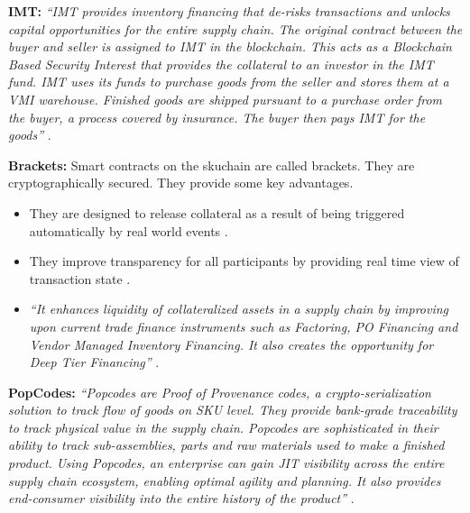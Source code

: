 \textbf{IMT:}
\textit{“IMT provides inventory financing that de-risks transactions and unlocks capital opportunities for the entire supply chain. The original contract between the buyer and seller is assigned to IMT in the blockchain. This acts as a Blockchain Based Security Interest that provides the collateral to an investor in the IMT fund. IMT uses its funds to purchase goods from the seller and stores them at a VMI warehouse. Finished goods are shipped pursuant to a purchase order from the buyer, a process covered by insurance. The buyer then pays IMT for the goods”} \cite{misc:015}.

\textbf{Brackets:}
Smart contracts on the skuchain are called brackets. They are cryptographically secured. They provide some key advantages. 

\begin{itemize}

\item They are designed to release collateral as a result of being triggered automatically by real world events \cite{misc:015}. 
\item  They improve transparency for all participants by providing real time view of transaction state \cite{misc:015}. 
\item  \textit{“It enhances liquidity of collateralized assets in a supply chain by improving upon current trade finance instruments such as Factoring, PO Financing and Vendor Managed Inventory Financing. It also creates the opportunity for Deep Tier Financing”} \cite{misc:015}. 
\end{itemize}

\textbf{PopCodes:}
\textit{“Popcodes are Proof of Provenance codes, a crypto-serialization solution to track flow of goods on SKU level. They provide bank-grade traceability to track physical value in the supply chain. Popcodes are sophisticated in their ability to track sub-assemblies, parts and raw materials used to make a finished product. Using Popcodes, an enterprise can gain JIT visibility across the entire supply chain ecosystem, enabling optimal agility and planning. It also provides end-consumer visibility into the entire history of the product”} \cite{misc:015}.

